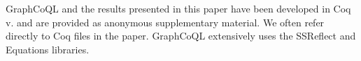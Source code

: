 GraphCoQL and the results presented in this paper have been developed in Coq v. and are provided as anonymous supplementary material. We often refer directly to Coq files in the paper. GraphCoQL extensively uses the 
\textsf{SSReflect}  and \textsf{Equations}  libraries. 





